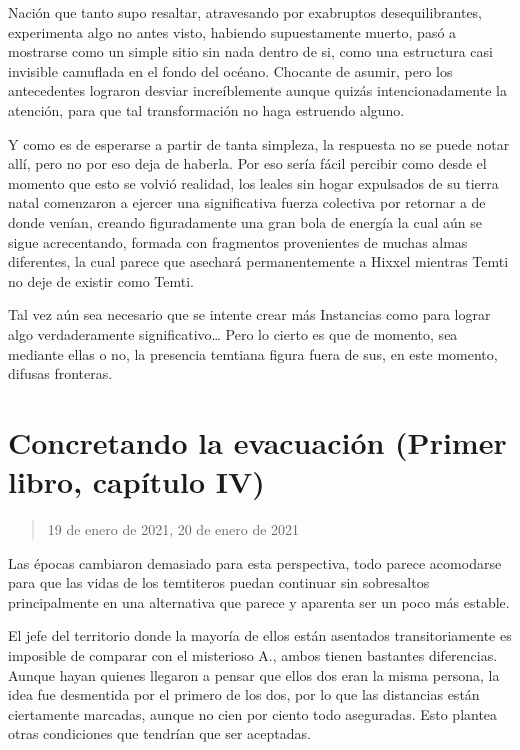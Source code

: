 \documentclass[
  spanish,
]{book}
\begin{document}
Nación que tanto supo resaltar, atravesando por exabruptos desequilibrantes, experimenta algo no antes visto, habiendo supuestamente muerto, pasó a mostrarse como un simple sitio sin nada dentro de si, como una estructura casi invisible camuflada en el fondo del océano. Chocante de asumir, pero los antecedentes lograron desviar increíblemente aunque quizás intencionadamente la atención, para que tal transformación no haga estruendo alguno.

Y como es de esperarse a partir de tanta simpleza, la respuesta no se puede notar allí, pero no por eso deja de haberla. Por eso sería fácil percibir como desde el momento que esto se volvió realidad, los leales sin hogar expulsados de su tierra natal comenzaron a ejercer una significativa fuerza colectiva por retornar a de donde venían, creando figuradamente una gran bola de energía la cual aún se sigue acrecentando, formada con fragmentos provenientes de muchas almas diferentes, la cual parece que asechará permanentemente a Hixxel mientras Temti no deje de existir como Temti.

Tal vez aún sea necesario que se intente crear más Instancias como para lograr algo verdaderamente significativo\ldots{} Pero lo cierto es que de momento, sea mediante ellas o no, la presencia temtiana figura fuera de sus, en este momento, difusas fronteras.

\hypertarget{concretando-la-evacuaciuxf3n-primer-libro-capuxedtulo-iv}{%
\section{Concretando la evacuación (Primer libro, capítulo IV)}\label{concretando-la-evacuaciuxf3n-primer-libro-capuxedtulo-iv}}

\begin{quote}
19 de enero de 2021, 20 de enero de 2021
\end{quote}

Las épocas cambiaron demasiado para esta perspectiva, todo parece acomodarse para que las vidas de los temtiteros puedan continuar sin sobresaltos principalmente en una alternativa que parece y aparenta ser un poco más estable.

El jefe del territorio donde la mayoría de ellos están asentados transitoriamente es imposible de comparar con el misterioso A., ambos tienen bastantes diferencias. Aunque hayan quienes llegaron a pensar que ellos dos eran la misma persona, la idea fue desmentida por el primero de los dos, por lo que las distancias están ciertamente marcadas, aunque no cien por ciento todo aseguradas. Esto plantea otras condiciones que tendrían que ser aceptadas.
\end{document}

